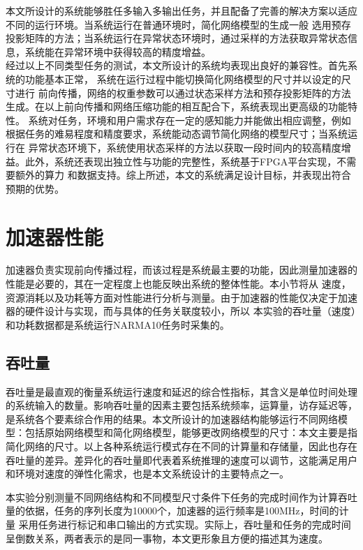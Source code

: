 本文所设计的系统能够胜任多输入多输出任务，并且配备了完善的解决方案以适应不同的运行环境。当系统运行在普通环境时，简化网络模型的生成一般
选用预存投影矩阵的方法；当系统运行在异常状态环境时，通过采样的方法获取异常状态信息，系统能在异常环境中获得较高的精度增益。%
\\

经过以上不同类型任务的测试，本文所设计的系统均表现出良好的兼容性。首先系统的功能基本正常， 系统在运行过程中能切换简化网络模型的尺寸并以设定的尺寸进行
前向传播，网络的权重参数可以通过状态采样方法和预存投影矩阵的方法生成。在以上前向传播和网络压缩功能的相互配合下，系统表现出更高级的功能特性。
系统对任务，环境和用户需求存在一定的感知能力并能做出相应调整，例如根据任务的难易程度和精度要求，系统能动态调节简化网络的模型尺寸；当系统运行在
异常状态环境下，系统使用状态采样的方法以获取一段时间内的较高精度增益。此外，系统还表现出独立性与功能的完整性，系统基于FPGA平台实现，不需要额外的算力
和数据支持。综上所述，本文的系统满足设计目标，并表现出符合预期的优势。




\section{加速器性能}

加速器负责实现前向传播过程，而该过程是系统最主要的功能，因此测量加速器的性能是必要的，其在一定程度上也能反映出系统的整体性能。本小节将从
速度，资源消耗以及功耗等方面对性能进行分析与测量。由于加速器的性能仅决定于加速器的硬件设计与实现，而与具体的任务关联度较小，所以
本实验的吞吐量（速度）和功耗数据都是系统运行NARMA10任务时采集的。
\subsection{吞吐量}
吞吐量是最直观的衡量系统运行速度和延迟的综合性指标，其含义是单位时间处理的系统输入的数量。影响吞吐量的因素主要包括系统频率，运算量，访存延迟等，
是系统各个要素综合作用的结果。本文所设计的加速器结构能够运行不同网络模型：包括原始网络模型和简化网络模型，能够更改网络模型的尺寸：本文主要是指
简化网络的尺寸。以上各种系统运行模式存在不同的计算量和存储量，因此也存在吞吐量的差异。差异化的吞吐量即代表着系统推理的速度可以调节，这能满足用户
和环境对速度的弹性化需求，也是本文系统设计的主要特点之一。

本实验分别测量不同网络结构和不同模型尺寸条件下任务的完成时间作为计算吞吐量的依据，任务的序列长度为10000个，加速器的运行频率是100MHz，时间的计量
采用任务进行标记和串口输出的方式实现。实际上，吞吐量和任务的完成时间呈倒数关系，两者表示的是同一事物，本文更形象且方便的描述其为速度。

